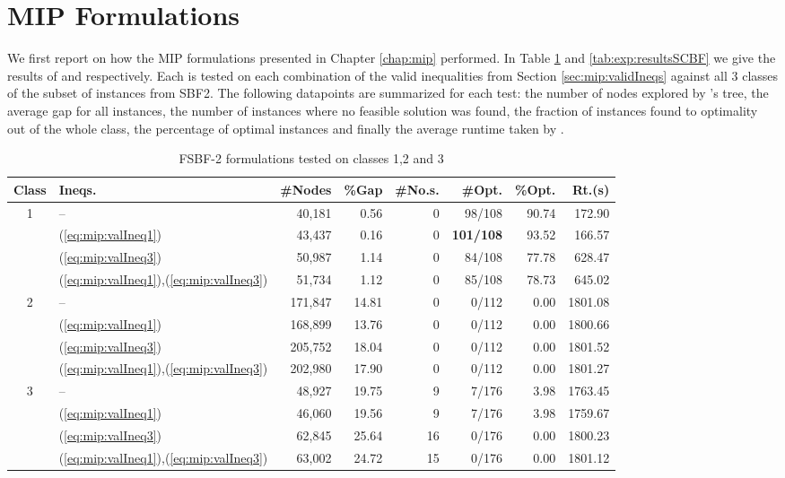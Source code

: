 \section{MIP Formulations}
\label{sec:exp:mip}
We first report on how the MIP formulations presented
in Chapter \ref{chap:mip} performed.
In Table \ref{tab:exp:resultsFSBF} and \ref{tab:exp:resultsSCBF} we give the results
of  and  respectively.
Each is tested on each combination of the valid inequalities from
Section \ref{sec:mip:validIneqs} against
all 3 classes of the subset
of instances from SBF2.
The following datapoints are summarized for each test:
the number of nodes explored by \gurobi's \bab tree,
the average gap for all instances,
the number of instances where no feasible solution was found,
the fraction of instances found to optimality out of the whole class,
the percentage of optimal instances and finally
the average runtime taken by \gurobi.

\begin{table}[tpb]
	\caption{FSBF-2 formulations tested on classes 1,2 and 3}
	\centering
	\vspace{2mm}
	\begin{tabular}{clrrrrrr}
		\toprule
		Class & Ineqs. & \#Nodes & \%Gap & \#No.s. & \#Opt. & \%Opt. & Rt.(s) \\\midrule\midrule
		1 & -- & 40,181 & 0.56 & 0 & 98/108 & 90.74 & 172.90 \\
		 & (\ref{eq:mip:valIneq1}) & 43,437 & 0.16 & 0 & \bf{101}/108 & 93.52 & 166.57 \\
		 & (\ref{eq:mip:valIneq3}) & 50,987 & 1.14 & 0 & 84/108 & 77.78 & 628.47 \\
		 & (\ref{eq:mip:valIneq1}),(\ref{eq:mip:valIneq3}) & 51,734 & 1.12 & 0 & 85/108 & 78.73 & 645.02 \\\midrule
		2 & -- & 171,847 & 14.81 & 0 & 0/112 & 0.00 & 1801.08 \\
		 & (\ref{eq:mip:valIneq1}) & 168,899 & 13.76 & 0 & 0/112 & 0.00 & 1800.66 \\
		 & (\ref{eq:mip:valIneq3}) & 205,752 & 18.04 & 0 & 0/112 & 0.00 & 1801.52 \\
		 & (\ref{eq:mip:valIneq1}),(\ref{eq:mip:valIneq3}) & 202,980 & 17.90 & 0 & 0/112 & 0.00 & 1801.27 \\\midrule
		3 & -- & 48,927 & 19.75 & 9 & 7/176 & 3.98 & 1763.45 \\
		 & (\ref{eq:mip:valIneq1}) & 46,060 & 19.56 & 9 & 7/176 & 3.98 & 1759.67 \\
		 & (\ref{eq:mip:valIneq3}) & 62,845 & 25.64 & 16 & 0/176 & 0.00 & 1800.23 \\
		 & (\ref{eq:mip:valIneq1}),(\ref{eq:mip:valIneq3}) & 63,002 & 24.72 & 15 & 0/176 & 0.00 & 1801.12 \\
		\bottomrule
	\end{tabular}
	\label{tab:exp:resultsFSBF}
\end{table}

